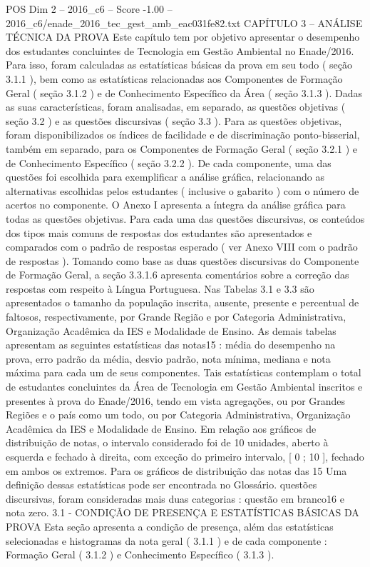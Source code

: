 \begin{textsample}{POS Dim 2 – 2016\_c6 – Score -1.00 – 2016\_c6/enade\_2016\_tec\_gest\_amb\_eac031fe82.txt}  \label{ex:f2_pos_211}
CAPÍTULO 3 – ANÁLISE TÉCNICA DA PROVA Este capítulo tem por objetivo apresentar o desempenho dos estudantes concluintes de Tecnologia em Gestão Ambiental no Enade/2016.
Para isso, foram calculadas as estatísticas básicas da prova em seu todo ( seção 3.1.1 ), bem como as estatísticas relacionadas aos Componentes de Formação Geral ( seção 3.1.2 ) e de Conhecimento Específico da Área ( seção 3.1.3 ).
Dadas as suas características, foram analisadas, em separado, as questões objetivas ( seção 3.2 ) e as questões discursivas ( seção 3.3 ).
Para as questões objetivas, foram disponibilizados os índices de facilidade e de discriminação ponto-bisserial, também em separado, para os Componentes de Formação Geral ( seção 3.2.1 ) e de Conhecimento Específico ( seção 3.2.2 ).
De cada componente, uma das questões foi escolhida para exemplificar a análise gráfica, relacionando as alternativas escolhidas pelos estudantes ( inclusive o gabarito ) com o número de acertos no componente.
O Anexo I apresenta a íntegra da análise gráfica para todas as questões objetivas.
Para cada uma das questões discursivas, os conteúdos dos tipos mais comuns de respostas dos estudantes são apresentados e comparados com o padrão de respostas esperado ( ver Anexo VIII com o padrão de respostas ).
Tomando como base as duas questões discursivas do Componente de Formação Geral, a seção 3.3.1.6 apresenta comentários sobre a correção das respostas com respeito à Língua Portuguesa.
Nas Tabelas 3.1 e 3.3 são apresentados o tamanho da população inscrita, ausente, presente e percentual de faltosos, respectivamente, por Grande Região e por Categoria Administrativa, Organização Acadêmica da IES e Modalidade de Ensino.
As demais tabelas apresentam as seguintes estatísticas das notas15 : média do desempenho na prova, erro padrão da média, desvio padrão, nota mínima, mediana e nota máxima para cada um de seus componentes.
Tais estatísticas contemplam o total de estudantes concluintes da Área de Tecnologia em Gestão Ambiental inscritos e presentes à prova do Enade/2016, tendo em vista agregações, ou por Grandes Regiões e o país como um todo, ou por Categoria Administrativa, Organização Acadêmica da IES e Modalidade de Ensino.
Em relação aos gráficos de distribuição de notas, o intervalo considerado foi de 10 unidades, aberto à esquerda e fechado à direita, com exceção do primeiro intervalo, [ 0 ; 10 ], fechado em ambos os extremos.
Para os gráficos de distribuição das notas das 15 Uma definição dessas estatísticas pode ser encontrada no Glossário. questões discursivas, foram consideradas mais duas categorias : questão em branco16 e nota zero. 3.1 - CONDIÇÃO DE PRESENÇA E ESTATÍSTICAS BÁSICAS DA PROVA Esta seção apresenta a condição de presença, além das estatísticas selecionadas e histogramas da nota geral ( 3.1.1 ) e de cada componente : Formação Geral ( 3.1.2 ) e Conhecimento Específico ( 3.1.3 ).

\end{textsample}
